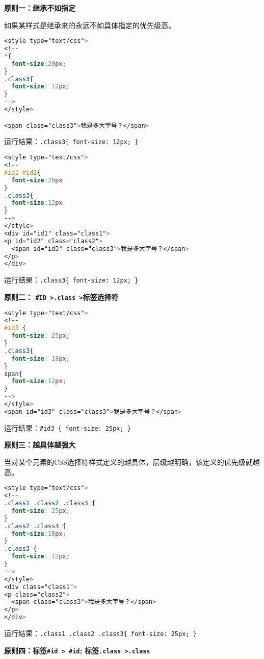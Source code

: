\textbf{原则一：继承不如指定}

如果某样式是继承来的永远不如具体指定的优先级高。


\begin{lstlisting}[language=CSS]
<style type="text/css">
<!--
*{ 
  font-size:20px; 
}
.class3{ 
  font-size: 12px; 
}
-->
</style>

<span class="class3">我是多大字号？</span>
\end{lstlisting}

运行结果：\verb|.class3{ font-size: 12px; }|



\begin{lstlisting}[language=CSS]
<style type="text/css">
<!--
#id1 #id2{ 
  font-size:20px 
}
.class3{ 
  font-size:12px 
}
-->
</style>
<div id="id1" class="class1">
<p id="id2" class="class2">
  <span id="id3" class="class3">我是多大字号？</span>
</p>
</div>
\end{lstlisting}


运行结果：\verb|.class3{ font-size: 12px; }|

\clearpage

\textbf{原则二： \texttt{\#ID >.class >}标签选择符}



\begin{lstlisting}[language=CSS]
<style type="text/css">
<!--
#id3 { 
  font-size: 25px; 
}
.class3{ 
  font-size: 18px; 
}
span{ 
  font-size:12px; 
}
-->
</style>
<span id="id3" class="class3">我是多大字号？</span>
\end{lstlisting}

运行结果：\verb|#id3 { font-size: 25px; }|

\clearpage

\textbf{原则三：越具体越强大}


当对某个元素的CSS选择符样式定义的越具体，层级越明确，该定义的优先级就越高。

\begin{lstlisting}[language=CSS]
<style type="text/css">
<!--
.class1 .class2 .class3 { 
  font-size: 25px; 
}
.class2 .class3 { 
  font-size:18px; 
}
.class3 { 
  font-size: 12px; 
}
-->
</style>
<div class="class1">
<p class="class2">
  <span class="class3">我是多大字号？</span>
</p>
</div>
\end{lstlisting}

运行结果：\verb|.class1 .class2 .class3{ font-size: 25px; }|

\clearpage

\textbf{原则四：标签\texttt{\#id > \#id}; 标签\texttt{.class >.class}}

